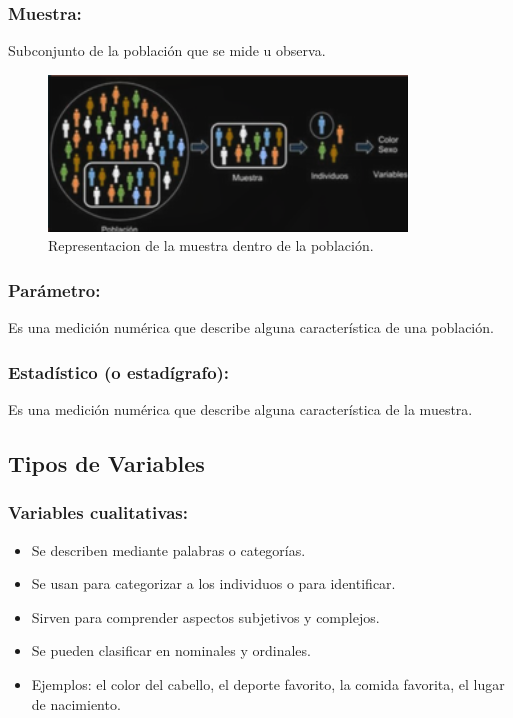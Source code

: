 \documentclass[12pt, letterpaper]{article}
\begin{document}
\subsubsection{Muestra:} %
Subconjunto de la población que se mide u observa.

\begin{figure}[h]
    \centering
    \includegraphics[width=0.85\textwidth]{muestra}
    \caption{Representacion de la muestra dentro de la población.}
    \label{fig:muestra}
\end{figure}


\subsubsection{Parámetro:} %
Es una medición numérica que describe alguna característica de una población.

\subsubsection{Estadístico (o estadígrafo):} %
Es una medición numérica que describe alguna característica de la muestra.

\subsection{Tipos de Variables}

\subsubsection{Variables cualitativas:} %
\begin{itemize}
    \item Se describen mediante palabras o categorías.
    \item Se usan para categorizar a los individuos o para identificar.
    \item Sirven para comprender aspectos subjetivos y complejos.
    \item Se pueden clasificar en nominales y ordinales.
    \item Ejemplos: el color del cabello, el deporte favorito, la comida favorita, el lugar de nacimiento.
\end{itemize}
\end{document}

